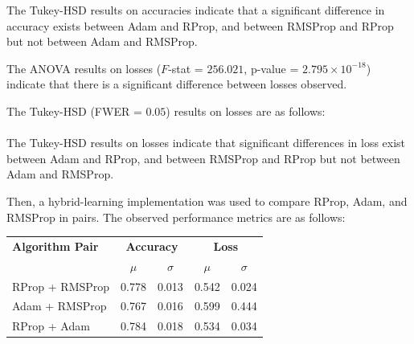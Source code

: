 The Tukey-HSD results on accuracies indicate that a significant difference in accuracy exists between Adam and RProp, and between RMSProp and RProp but not between
Adam and RMSProp.

The ANOVA results on losses
($F$-stat = $256.021$, p-value = $2.795 \times 10^{-18}$) indicate that there is a significant difference between losses observed.

The Tukey-HSD (FWER = $0.05$) results on losses are as follows: \\

\noindent
{} \\

The Tukey-HSD results on losses indicate that significant differences in loss exist between 
Adam and RProp, and between RMSProp and RProp but not between Adam and RMSProp.

Then, a hybrid-learning implementation was used to compare RProp, Adam, and RMSProp in pairs. The observed performance metrics
are as follows: \\

\noindent
\footnotesize
\setlength{\tabcolsep}{6pt}
\renewcommand{\arraystretch}{1.0}
\begin{center}
\begin{tabular}{l|cc|cc}
\toprule
\textbf{Algorithm Pair} & \multicolumn{2}{c|}{\textbf{Accuracy}} & \multicolumn{2}{c}{\textbf{Loss}} \\
\cmidrule(r){2-3} \cmidrule(l){4-5}
 & $\mu$ & $\sigma$ & $\mu$ & $\sigma$ \\
\midrule 
RProp + RMSProp   & 0.778 & 0.013 & 0.542 & 0.024 \\
Adam + RMSProp   & 0.767 & 0.016 & 0.599 & 0.444 \\
RProp + Adam   & 0.784 & 0.018 & 0.534 & 0.034 \\
\bottomrule
\end{tabular}
\end{center}

